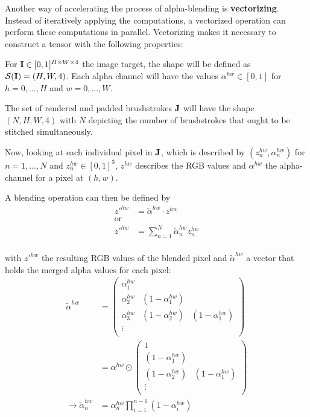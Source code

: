 Another way of accelerating the process of alpha-blending is \textbf{vectorizing}.
Instead of iteratively applying the computations, a vectorized operation can perform these computations in parallel.
Vectorizing makes it necessary to construct a tensor with the following properties:

For $\mathbf{I} \in [0, 1]^{H \times W \times 4} $ the image target, the shape will be defined
as $\mathcal{S}(\mathbf{I}) = (H, W, 4)$.
Each alpha channel will have the values $\alpha^{hw} \in [0, 1]$ for $h = 0, ..., H$ and $w = 0, ..., W$.

The set of rendered and padded brushstrokes $\mathbf{J}$ will have the shape $(N, H, W, 4)$ with $N$ depicting the number of brushstrokes that ought to be stitched simultaneously.

Now, looking at each individual pixel in $\mathbf{J}$, which is described by $(z^{hw}_n, \alpha^{hw}_n)$ for $n = 1, ..., N$ and $z^{hw}_n \in [0, 1]^{3}$, $z^{hw}$ describes the RGB values and $\alpha^{hw}$ the alpha-channel for a pixel at $(h, w)$.

A blending operation can then be defined by
\begin{align}
    z'^{hw} & = \tilde{\alpha}^{hw} \cdot z^{hw} \\
    \text{or} \\
    z'^{hw} & = \sum_{n=1}^N \tilde{\alpha}^{hw}_n  z^{hw}_n \\
\end{align}

with $z'^{hw}$ the resulting RGB values of the blended pixel and $\tilde{\alpha}^{hw}$ a vector that holds the merged alpha values for each pixel:
\begin{align}
    \tilde{\alpha}^{hw} & =
    \begin{pmatrix}
        \alpha^{hw}_1 & &\\
        \alpha^{hw}_2 & (1 - \alpha^{hw}_1) &\\
        \alpha^{hw}_3 & (1 - \alpha^{hw}_2) & (1 - \alpha^{hw}_1)\\
        \vdots & &\\
    \end{pmatrix}
    \\
    & = \alpha^{hw} \odot 
    \begin{pmatrix}
        1  &\\
        (1 - \alpha^{hw}_1) &\\
        (1 - \alpha^{hw}_2) & (1 - \alpha^{hw}_1)\\
        \vdots &\\
    \end{pmatrix}
    \\
    \rightarrow  \tilde{\alpha}^{hw}_n & = \alpha^{hw}_n \prod^{n-1}_{i=1} (1 - \alpha^{hw}_i)
\end{align}

